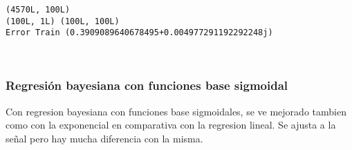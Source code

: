 \documentclass[11pt]{article}
\begin{document}
    \begin{Verbatim}[commandchars=\\\{\}]
(4570L, 100L)
(100L, 1L) (100L, 100L)
Error Train (0.3909089640678495+0.004977291192292248j)

    \end{Verbatim}

    \begin{center}
    \end{center}
    { \hspace*{\fill} \\}
    
    \subsubsection{Regresión bayesiana con funciones base
sigmoidal}\label{regresiuxf3n-bayesiana-con-funciones-base-sigmoidal}

    Con regresion bayesiana con funciones base sigmoidales, se ve mejorado
tambien como con la exponencial en comparativa con la regresion lineal.
Se ajusta a la señal pero hay mucha diferencia con la misma.
\end{document}
